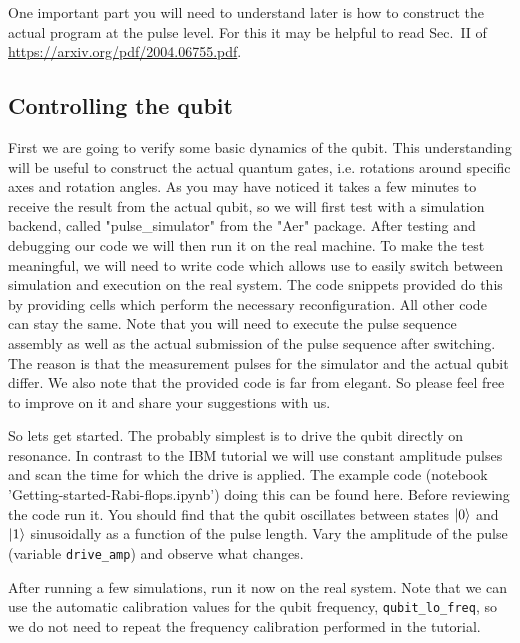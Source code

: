 \documentclass{../lab}
\begin{document}
One important part you will need to understand later is how to construct the actual program at the pulse level. For this it may be helpful to read Sec.~II of \url{https://arxiv.org/pdf/2004.06755.pdf}.



\subsection{Controlling the qubit}
First we are going to verify some basic dynamics of the qubit. This understanding will be useful to construct the actual quantum gates, i.e. rotations around specific axes and rotation angles. As you may have noticed it takes a few minutes to receive the result from the actual qubit, so we will first test with a simulation backend, called "pulse\_simulator" from the "Aer" package. After testing and debugging our code we will then run it on the real machine. To make the test meaningful, we will need to write code which allows use to easily switch between simulation and execution on the real system. The code snippets provided do this by providing cells which perform the necessary reconfiguration. All other code can stay the same. Note that you will need to execute the pulse sequence assembly as well as the actual submission of the pulse sequence after switching. The reason is that the measurement pulses for the simulator and the actual qubit differ. We also note that the provided code is far from elegant. So please feel free to improve on it and share your suggestions with us.  

So lets get started. The probably simplest is to drive the qubit directly on resonance. In contrast to the IBM tutorial we will use constant amplitude pulses and scan the time for which the drive is applied. The example code (notebook 'Getting-started-Rabi-flops.ipynb') doing this can be found here.
Before reviewing the code run it. You should find that the qubit oscillates between states $\ket{0}$ and $\ket{1}$ sinusoidally as a function of the pulse length. Vary the amplitude of the pulse (variable \verb|drive_amp|) and observe what changes. 

After running a few simulations, run it now on the real system. Note that we can use the automatic calibration values for the qubit frequency, \verb|qubit_lo_freq|, so we do not need to repeat the frequency calibration performed in the tutorial. 
\end{document}
